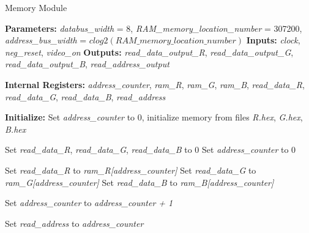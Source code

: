 \begin{algorithm}[H]
	\caption{Memory Module \cite{fpgaipvgarepo}}
	\begin{algorithmic}[1]
		\Require
		\Statex \textbf{Parameters:}
		\Statex \hspace{1em} \textit{databus\_width} = 8,
		\Statex \hspace{1em} \textit{RAM\_memory\_location\_number} = 307200,
		\Statex \hspace{1em} \textit{address\_bus\_width} = $clog2(RAM\_memory\_location\_number)$
		\Require
		\Statex \textbf{Inputs:}
		\Statex \hspace{1em} \textit{clock}, \textit{neg\_reset}, \textit{video\_on}
		\Ensure
		\Statex \textbf{Outputs:}
		\Statex \hspace{1em} \textit{read\_data\_output\_R}, \textit{read\_data\_output\_G}, \textit{read\_data\_output\_B},
		\Statex \hspace{1em} \textit{read\_address\_output}
		\Statex
		
		\State \textbf{Internal Registers:}
		\hspace{1em} \textit{address\_counter}, \textit{ram\_R}, \textit{ram\_G}, \textit{ram\_B},
		\hspace{1em} \textit{read\_data\_R}, \textit{read\_data\_G}, \textit{read\_data\_B}, \textit{read\_address}
		
		\State
		
		\State \textbf{Initialize:}
		\hspace{1em} Set \textit{address\_counter} to 0, initialize memory from files \textit{R.hex}, \textit{G.hex}, \textit{B.hex}
		
		\State
		
		\State {}
		\State Set \textit{read\_data\_R}, \textit{read\_data\_G}, \textit{read\_data\_B} to 0
		\State Set \textit{address\_counter} to 0
		\EndWhile
		
		\State {}
		\State Set \textit{read\_data\_R} to \textit{ram\_R[address\_counter]}
		\State Set \textit{read\_data\_G} to \textit{ram\_G[address\_counter]}
		\State Set \textit{read\_data\_B} to \textit{ram\_B[address\_counter]}
		
		\State {}
		\State Set \textit{address\_counter} to \textit{address\_counter + 1}
		
		\State {}
		\State Set \textit{read\_address} to \textit{address\_counter}
		\EndWhile
		

\end{algorithmic}
\end{algorithm}
